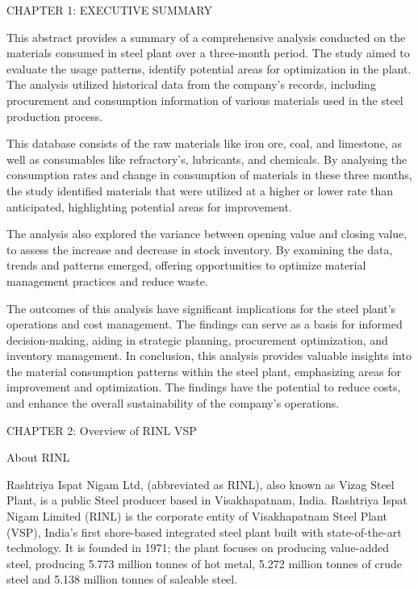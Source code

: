 \documentclass{article} %
\begin{document}
\noindent 

\noindent \eject 

\noindent 

\noindent CHAPTER 1: EXECUTIVE SUMMARY

\noindent 

\noindent This abstract provides a summary of a comprehensive analysis conducted on the materials consumed in steel plant over a three-month period. The study aimed to evaluate the usage patterns, identify potential areas for optimization in the plant. The analysis utilized historical data from the company's records, including procurement and consumption information of various materials used in the steel production process. 

\noindent This database consists of the raw materials like iron ore, coal, and limestone, as well as consumables like refractory's, lubricants, and chemicals. By analysing the consumption rates and change in consumption of materials in these three months, the study identified materials that were utilized at a higher or lower rate than anticipated, highlighting potential areas for improvement.

\noindent  The analysis also explored the variance between opening value and closing value, to assess the increase and decrease in stock inventory. By examining the data, trends and patterns emerged, offering opportunities to optimize material management practices and reduce waste. 

\noindent The outcomes of this analysis have significant implications for the steel plant's operations and cost management. The findings can serve as a basis for informed decision-making, aiding in strategic planning, procurement optimization, and inventory management. In conclusion, this analysis provides valuable insights into the material consumption patterns within the steel plant, emphasizing areas for improvement and optimization. The findings have the potential to reduce costs, and enhance the overall sustainability of the company's operations.

\noindent \eject 

\noindent 

\noindent CHAPTER 2: Overview of RINL VSP

 About RINL

\noindent Rashtriya Ispat Nigam Ltd, (abbreviated as RINL), also known as Vizag Steel Plant, is a public Steel producer based in Visakhapatnam, India. Rashtriya Ispat Nigam Limited (RINL) is the corporate entity of Visakhapatnam Steel Plant (VSP), India's first shore-based integrated steel plant built with state-of-the-art technology. It is founded in 1971; the plant focuses on producing value-added steel, producing 5.773 million tonnes of hot metal, 5.272 million tonnes of crude steel and 5.138 million tonnes of saleable steel. 
\end{document}
